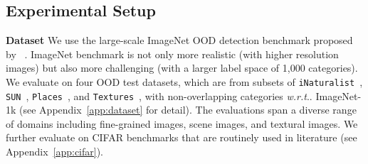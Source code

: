 \documentclass{article}
\makeatletter
\newcommand{\SL}[1]{{\color{blue}[\textbf{Sharon}: #1]}}
\DeclareRobustCommand\onedot{\futurelet\@let@token\@onedot}
\def\@onedot{\ifx\@let@token.\else.\null\fi\xspace}
\def\wrt{\emph{w.r.t}\onedot} \def\dof{d.o.f\onedot}
\makeatother
\begin{document}
\subsection{Experimental Setup}
\label{sec:exp_setup}
\vspace{-0.2cm}
\textbf{Dataset} 
We use the large-scale ImageNet OOD detection benchmark proposed by \citeauthor{huang2021mos}~\cite{huang2021mos}.
ImageNet benchmark is not only more realistic (with higher resolution images) but also more challenging (with a larger label space of 1,000 categories). 
We evaluate on four OOD test datasets, which are from subsets of \texttt{iNaturalist}~\cite{van2018inaturalist}, \texttt{SUN}~\cite{xiao2010sun}, \texttt{Places}~\cite{zhou2017places}, and \texttt{Textures}~\cite{cimpoi2014describing}, with non-overlapping categories \wrt ImageNet-1k (see Appendix~\ref{app:dataset} for detail). The evaluations span a diverse range of domains including fine-grained images, scene images, and textural images. We further evaluate on CIFAR benchmarks that are routinely used in literature (see Appendix~\ref{app:cifar}).

\end{document}
